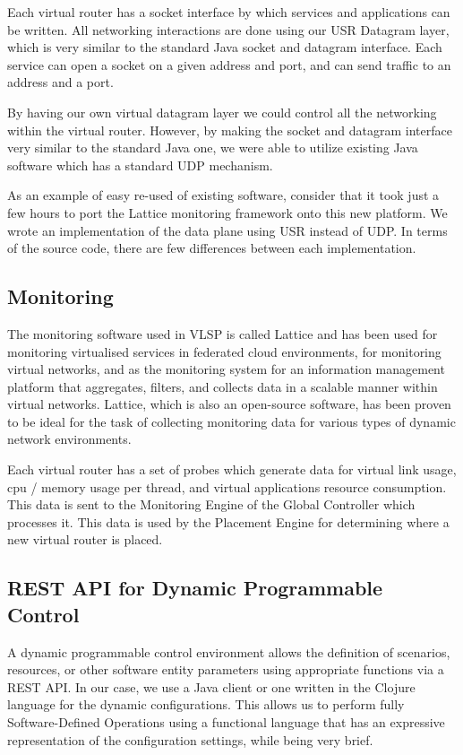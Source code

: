 Each virtual router has a socket interface by which services and
applications can be written.  All networking interactions are done using
our USR Datagram layer, which is very similar to the standard Java
socket and datagram interface.
Each service can open a socket on a given address and port, and
can send traffic to an address and a port.

By having our own virtual datagram layer we could control all the
networking within the virtual router.  However, by making the socket
and datagram interface very similar to the standard Java one, we were
able to utilize existing Java software which has a standard UDP
mechanism.

As an example of easy re-used of existing software, consider that it
took just a few hours to port the Lattice monitoring
framework onto this new platform.  We wrote an implementation of the
data plane using USR instead of UDP.  In terms of the source code,
there are few differences between each implementation.

\subsection{Monitoring}

The monitoring software used in VLSP is called Lattice and has been
used for monitoring virtualised services in federated cloud
environments, for monitoring virtual networks, and as the
monitoring system for an information management platform that
aggregates, filters, and collects data in a scalable manner within
virtual networks. Lattice, which is also an open-source
software, has been proven to be ideal for the task of collecting
monitoring data for various types of dynamic network environments.

Each virtual router has a set of probes which generate data for
virtual link usage, cpu / memory usage per thread, and virtual
applications resource consumption. This data is sent to the Monitoring
Engine of the Global Controller which processes it. This data is
used by the Placement Engine for determining where a new virtual
router is placed. 

\subsection{REST API for Dynamic Programmable Control}

A dynamic programmable control environment allows the definition of
scenarios, resources, or other software entity parameters using
appropriate functions via a REST API. In our case, we use a Java
client or one written in the Clojure language
for the dynamic configurations. This allows us to perform fully
Software-Defined Operations using a functional language that has an
expressive representation of the configuration settings, while being
very brief.

